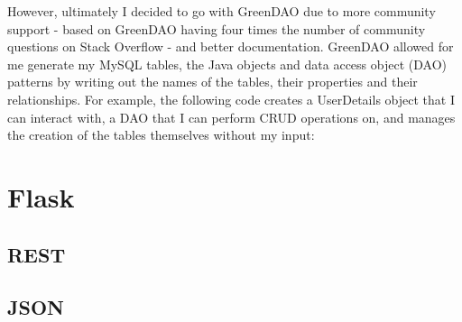 However, ultimately I decided to go with GreenDAO due to more community support - based on GreenDAO having four times the number of community questions on Stack Overflow - and better documentation.
GreenDAO allowed for me generate my MySQL tables, the Java objects and data access object (DAO) patterns by writing out the names of the tables, their properties and their relationships. 
For example, the following code creates a UserDetails object that I can interact with, a DAO that I can perform CRUD operations on, and manages the creation of the tables themselves without my input:


\section{Flask}

\subsection{REST}

\subsection{JSON}